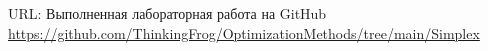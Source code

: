 \documentclass[../body.tex]{subfiles}
\begin{document}
URL: Выполненная лабораторная работа на GitHub \\ \url{https://github.com/ThinkingFrog/OptimizationMethods/tree/main/Simplex}
\end{document}
